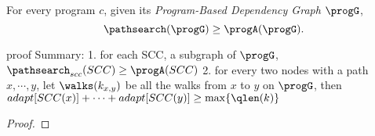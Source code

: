 \begin{thm}
  \label{thm:sound_adaptalg}
  For every program $c$, given its \emph{Program-Based Dependency Graph} $\progG$,
   $$\pathsearch(\progG) \geq \progA(\progG).$$
\end{thm}
proof Summary:
1. for each SCC, a subgraph of $\progG$, $\pathsearch_{scc}(SCC) \geq \progA(SCC)$
2. for every two nodes with a path $x, \cdots, y$, let $\walks(k_{x,y})$ be all the walks from $x$ to $y$ on $\progG$,
then $adapt[SCC(x)] + \cdots + adapt[SCC(y)] \geq \max\{\qlen(k)\}$
\begin{proof}

\end{proof}